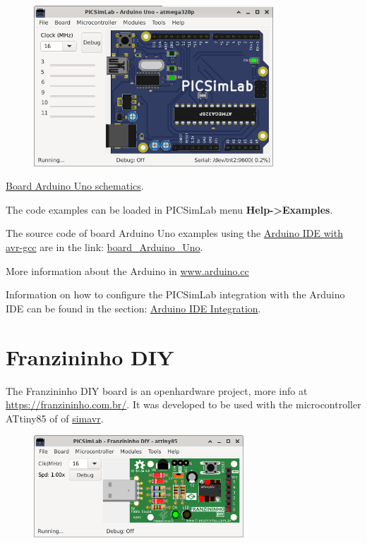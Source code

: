 \begin{figure}[H]
\center
\includegraphics[width=0.80\textwidth]{img/picsimlab5.png} 
\end{figure} 

\href{https://www.arduino.cc/en/uploads/Main/Arduino_Uno_Rev3-schematic.pdf}{Board Arduino Uno schematics}.\vspace{0.5cm}

The code examples can be loaded in PICSimLab menu \textbf{Help->Examples}.

The source code of board Arduino Uno examples using the 
\href{https://www.arduino.cc/en/Main/Software}{Arduino IDE with avr-gcc} are in the link: 
\href{https://lcgamboa.github.io/picsimlab_examples/board_Arduino_Uno.html}{board\_Arduino\_Uno}.

More information about the Arduino in \href{https://www.arduino.cc/}{www.arduino.cc}

Information on how to configure the PICSimLab integration with the Arduino IDE can be found in the 
section: \hyperlink{def:arduinoide}{Arduino IDE Integration}.

\section{Franzininho DIY}

The Franzininho DIY board is an openhardware project, more info at \href{https://franzininho.com.br/}{https://franzininho.com.br/}.
It was developed to be used with the microcontroller ATtiny85 of 
of \href{https://github.com/buserror/simavr}{simavr}.

\begin{figure}[H]
\center
\includegraphics[width=0.7\textwidth]{img/board_Franzininho_DIY.png} 
\end{figure} 

